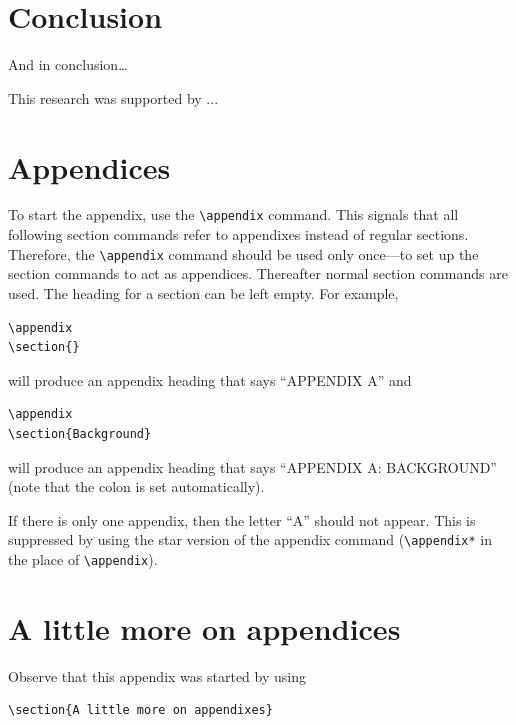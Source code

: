 \documentclass[reprint]{JASAnew}
\begin{document}
\section{\label{sec:5}Conclusion}

And in conclusion\ldots

\begin{acknowledgments}
This research was supported by  ...
\end{acknowledgments}




\appendix
\section{Appendices}
To start the appendix, use the \verb+\appendix+ command.
This signals that all following section commands refer to appendixes
instead of regular sections. Therefore, the \verb+\appendix+ command
should be used only once---to set up the section commands to act as
appendices. Thereafter normal section commands are used. The heading
for a section can be left empty. For example,
\begin{verbatim}
\appendix
\section{}
\end{verbatim}
will produce an appendix heading that says ``APPENDIX A'' and
\begin{verbatim}
\appendix
\section{Background}
\end{verbatim}
will produce an appendix heading that says ``APPENDIX A: BACKGROUND''
(note that the colon is set automatically).

If there is only one appendix, then the letter ``A'' should not
appear. This is suppressed by using the star version of the appendix
command (\verb+\appendix*+ in the place of \verb+\appendix+).
\vskip12pt
\vskip1sp
\section{A little more on appendices}

Observe that this appendix was started by using
\begin{verbatim}
\section{A little more on appendixes}
\end{verbatim}
\end{document}
